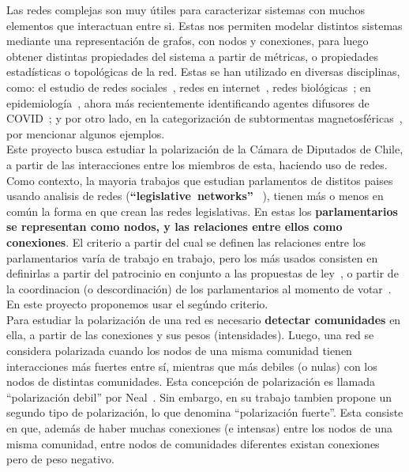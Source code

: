 \documentclass{proyectotesis}
\begin{document}
Las redes complejas son muy útiles para caracterizar sistemas con muchos elementos que interactuan entre si. Estas nos permiten modelar distintos sistemas mediante una representación de grafos, con nodos y conexiones, para luego obtener distintas propiedades del sistema a partir de métricas, o propiedades estadísticas o topológicas de la red. Estas se han utilizado en diversas disciplinas, como: el estudio de redes sociales~\cite{Newman_2003, Cantwell_2020}, redes en internet~\cite{Newman_2003}, redes biológicas~\cite{Newman_2003, Costa_2008}; en epidemiología~\cite{Karrer_2011}, ahora más recientemente identificando agentes difusores de COVID~\cite{Montes-Orozco_2020}; y por otro lado, en la categorización de subtormentas magnetosféricas~\cite{Dods_2015}, por mencionar algunos ejemplos.\\

Este proyecto busca estudiar la polarización de la Cámara de Diputados de Chile, a partir de las interacciones entre los miembros de esta, haciendo uso de redes. 
Como contexto, la mayoria trabajos que estudian parlamentos de distitos paises usando analisis de redes (\mbox{\textbf{``legislative networks''}}~\cite{Neal_2020, Waugh_2009, Aleman_2013, Zhang_2008, Fowler_2006, Andris_2015, Briatte_2016, LeFoulon_2019}
), tienen más o menos en común la forma en que crean las redes legislativas. En estas los \textbf{parlamentarios se representan como nodos, y las relaciones entre ellos como conexiones}. El criterio a partir del cual se definen las relaciones entre los parlamentarios varía de trabajo en trabajo, pero los más usados consisten en definirlas a partir del patrocinio en conjunto a las propuestas de ley~\cite{Neal_2020, Zhang_2008, LeFoulon_2019,Fowler_2006}, o partir de la coordinacion (o descordinación) de los parlamentarios al momento de votar~\cite{Waugh_2009, Andris_2015}. En este proyecto proponemos usar el segúndo criterio.\\

Para estudiar la polarización de una red es necesario \textbf{detectar comunidades} en ella, a partir de las conexiones y sus pesos (intensidades). Luego, una red se considera polarizada cuando los nodos de una misma comunidad tienen interacciones más fuertes entre sí, mientras que más debiles (o nulas) con los nodos de distintas comunidades. Esta concepción de polarización es llamada ``polarización debil'' por Neal~\cite{Neal_2020}. Sin embargo, en su trabajo tambien propone un segundo tipo de polarización, lo que denomina ``polarización fuerte''. Esta consiste en que, además de haber muchas conexiones (e intensas) entre los nodos de una misma comunidad, entre nodos de comunidades diferentes existan conexiones pero de peso negativo.\\
\end{document}
